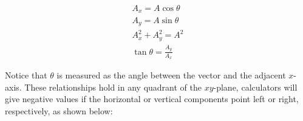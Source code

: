 \documentclass[dvipsnames]{article}
\begin{document}
\begin{center}
\begin{minipage}{0.3\textwidth}
\centering
{}
\end{minipage}%
\begin{minipage}{0.3\textwidth}
\begin{gather*}
    A_x = A\cos{\theta} \\[2pt]
    A_y = A\sin{\theta} \\[2pt]
    A_x^2 + A_y^2 = A^2 \\[2pt]
    \tan{\theta} = \frac{A_y}{A_x}
\end{gather*}
\vspace{2em}
\end{minipage}
\end{center}

Notice that $\theta$ is measured as the angle between the vector and the adjacent $x$-axis. These relationships hold in any quadrant of the $xy$-plane, calculators will give negative values if the horizontal or vertical components point left or right, respectively, as shown below:
\end{document}
